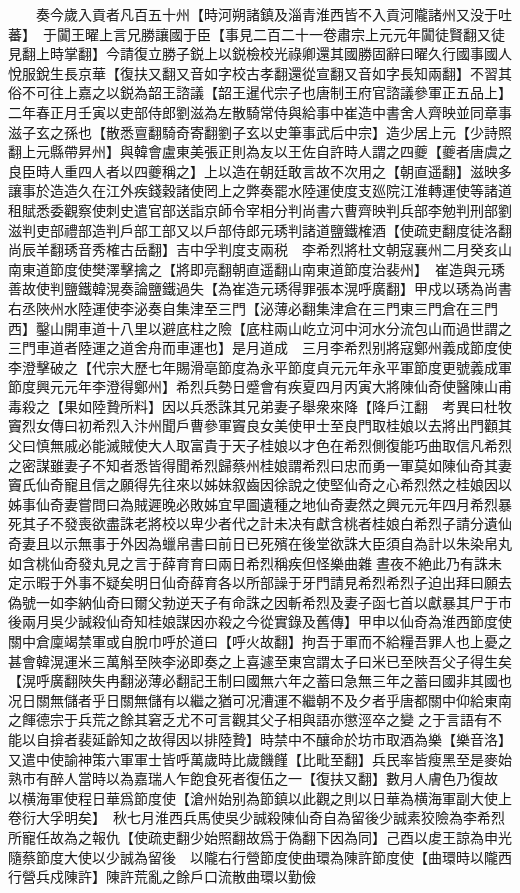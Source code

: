 　　奏今歲入貢者凡百五十州【時河朔諸鎮及淄青淮西皆不入貢河隴諸州又没于吐蕃】　于闐王曜上言兄勝讓國于臣【事見二百二十一卷肅宗上元元年闐徒賢翻又徒見翻上時掌翻】今請復立勝子鋭上以鋭檢校光祿卿還其國勝固辭曰曜久行國事國人悅服銳生長京華【復扶又翻又音如字校古孝翻還從宣翻又音如字長知兩翻】不習其俗不可往上嘉之以鋭為韶王諮議【韶王暹代宗子也唐制王府官諮議參軍正五品上】二年春正月壬寅以吏部侍郎劉滋為左散騎常侍與給事中崔造中書舍人齊映並同章事滋子玄之孫也【散悉亶翻騎奇寄翻劉子玄以史筆事武后中宗】造少居上元【少詩照翻上元縣帶昇州】與韓會盧東美張正則為友以王佐自許時人謂之四夔【夔者唐虞之良臣時人重四人者以四夔稱之】上以造在朝廷敢言故不次用之【朝直遥翻】滋映多讓事於造造久在江外疾錢穀諸使罔上之弊奏罷水陸運使度支廵院江淮轉運使等諸道租賦悉委觀察使刺史遣官部送詣京師令宰相分判尚書六曹齊映判兵部李勉判刑部劉滋判吏部禮部造判戶部工部又以戶部侍郎元琇判諸道鹽鐵榷酒【使疏吏翻度徒洛翻尚辰羊翻琇音秀榷古岳翻】吉中孚判度支兩税　李希烈將杜文朝寇襄州二月癸亥山南東道節度使樊澤擊擒之【將即亮翻朝直遥翻山南東道節度治裴州】　崔造與元琇善故使判鹽鐵韓滉奏論鹽鐵過失【為崔造元琇得罪張本滉呼廣翻】甲戍以琇為尚書右丞陜州水陸運使李泌奏自集津至三門【泌薄必翻集津倉在三門東三門倉在三門西】鑿山開車道十八里以避底柱之險【底柱兩山屹立河中河水分流包山而過世謂之三門車道者陸運之道舍舟而車運也】是月道成　三月李希烈别將寇鄭州義成節度使李澄擊破之【代宗大歷七年賜滑亳節度為永平節度貞元元年永平軍節度更號義成軍節度興元元年李澄得鄭州】希烈兵勢日蹙會有疾夏四月丙寅大將陳仙奇使醫陳山甫毒殺之【果如陸贄所料】因以兵悉誅其兄弟妻子舉衆來降【降戶江翻　考異曰杜牧竇烈女傳曰初希烈入汴州聞戶曹參軍竇良女美使甲士至良門取桂娘以去將出門顴其父曰慎無戚必能滅賊使大人取富貴于天子桂娘以才色在希烈側復能巧曲取信凡希烈之密謀雖妻子不知者悉皆得聞希烈歸蔡州桂娘謂希烈曰忠而勇一軍莫如陳仙奇其妻竇氏仙奇寵且信之願得先往來以姊妹叙齒因徐說之使堅仙奇之心希烈然之桂娘因以姊事仙奇妻嘗問曰為賊遲晚必敗姊宜早圖遺種之地仙奇妻然之興元元年四月希烈暴死其子不發喪欲盡誅老將校以卑少者代之計未决有獻含桃者桂娘白希烈子請分遺仙奇妻且以示無事于外因為蠟帛書曰前日已死殯在後堂欲誅大臣須自為計以朱染帛丸如含桃仙奇發丸見之言于薛育育曰兩日希烈稱疾但怪樂曲雜晝夜不絶此乃有誅未定示暇于外事不疑矣明日仙奇薛育各以所部譟于牙門請見希烈希烈子迫出拜曰願去偽號一如李納仙奇曰爾父勃逆天子有命誅之因斬希烈及妻子函七首以獻暴其尸于市後兩月吳少誠殺仙奇知桂娘謀因亦殺之今從實錄及舊傳】甲申以仙奇為淮西節度使　關中倉廩竭禁軍或自脫巾呼於道曰【呼火故翻】拘吾于軍而不給糧吾罪人也上憂之甚會韓滉運米三萬斛至陜李泌即奏之上喜遽至東宫謂太子曰米已至陜吾父子得生矣【滉呼廣翻陜失冉翻泌薄必翻記王制曰國無六年之蓄曰急無三年之蓄曰國非其國也况日關無儲者乎日關無儲有以繼之猶可况漕運不繼朝不及夕者乎唐都關中仰給東南之餫德宗于兵荒之餘其窘乏尤不可言觀其父子相與語亦懲涇卒之變之于言語有不能以自揜者裴延齡知之故得因以排陸贄】時禁中不釀命於坊市取酒為樂【樂音洛】又遣中使諭神策六軍軍士皆呼萬歲時比歲饑饉【比毗至翻】兵民率皆瘦黑至是麥始熟市有醉人當時以為嘉瑞人乍飽食死者復伍之一【復扶又翻】數月人膚色乃復故　以横海軍使程日華爲節度使【滄州始别為節鎮以此觀之則以日華為横海軍副大使上卷衍大孚明矣】　秋七月淮西兵馬使吳少誠殺陳仙奇自為留後少誠素狡險為李希烈所寵任故為之報仇【使疏吏翻少始照翻故爲于偽翻下因為同】己酉以䖍王諒為申光隨蔡節度大使以少誠為留後　以隴右行營節度使曲環為陳許節度使【曲環時以隴西行營兵戍陳許】陳許荒亂之餘戶口流散曲環以勤儉